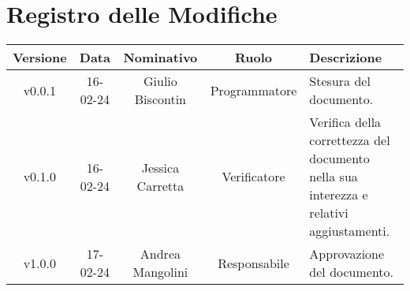 \section*{\Large Registro delle Modifiche}
    \begin{table}[h]
        \centering
        \renewcommand\tabularxcolumn[1]{m{#1}} %
        \renewcommand{\arraystretch}{1.5}
        \begin{tabularx}{0.98\textwidth}
            {c|c|c|c|>{\centering\arraybackslash}X}
            \rowcolor{black}
            \textbf{\color{white} Versione} & \textbf{\color{white} Data} & \textbf{\color{white} Nominativo} & \textbf{\color{white} Ruolo} & \textbf{\color{white} Descrizione} \\ 
            \hline

            v0.0.1 & 16-02-24 & Giulio Biscontin & Programmatore & Stesura del documento. \\
            v0.1.0 & 16-02-24 & Jessica Carretta & Verificatore & Verifica della correttezza del documento nella sua interezza e relativi aggiustamenti. \\
            v1.0.0 & 17-02-24 & Andrea Mangolini & Responsabile & Approvazione del documento. \\
            \hline
        \end{tabularx}
    \end{table}